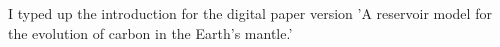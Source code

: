 I typed up the introduction for the digital paper version 'A reservoir model for the evolution of carbon in the Earth's mantle.'
